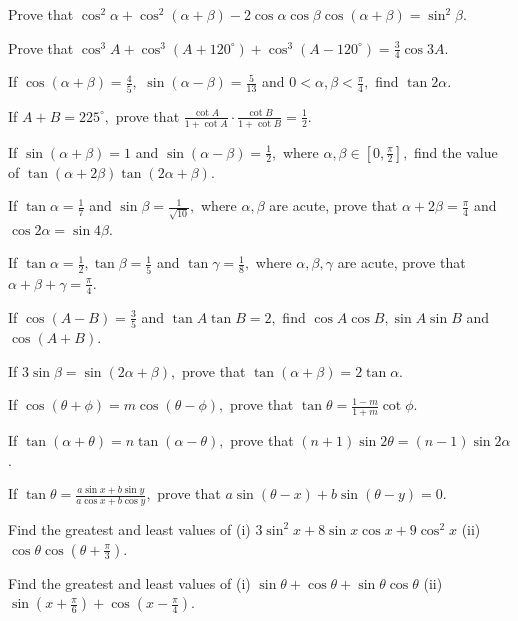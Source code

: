 \item Prove that $\cos^2\alpha + \cos^2(\alpha + \beta) - 2\cos\alpha\cos\beta\cos(\alpha + \beta) = \sin^2\beta$.

\item Prove that $\cos^3A + \cos^3(A + 120^\circ) + \cos^3(A - 120^\circ) = \frac{3}{4}\cos 3A$.

\item If $\cos(\alpha + \beta) = \frac{4}{5},$ $\sin(\alpha - \beta) = \frac{5}{13}$ and $0 < \alpha, \beta <
    \frac{\pi}{4},$ find $\tan 2\alpha$.

\item If $A + B = 225^\circ,$ prove that $\frac{\cot A}{1 + \cot A}\cdot\frac{\cot B}{1 + \cot B} = \frac{1}{2}$.

\item If $\sin(\alpha + \beta) = 1$ and $\sin(\alpha - \beta) = \frac{1}{2},$ where $\alpha, \beta \in \left[0,
    \frac{\pi}{2}\right],$ find the value of $\tan(\alpha + 2\beta)\tan(2\alpha + \beta)$.

\item If $\tan\alpha = \frac{1}{7}$ and $\sin\beta = \frac{1}{\sqrt{10}},$ where $\alpha, \beta$ are acute, prove that
    $\alpha + 2\beta = \frac{\pi}{4}$ and $\cos 2\alpha = \sin 4\beta$.

\item If $\tan\alpha = \frac{1}{2}, \tan\beta = \frac{1}{5}$ and $\tan\gamma = \frac{1}{8},$ where $\alpha, \beta,
    \gamma$ are acute, prove that $\alpha + \beta + \gamma = \frac{\pi}{4}$.

\item If $\cos(A - B) = \frac{3}{5}$ and $\tan A\tan B = 2,$ find $\cos A\cos B, \sin A\sin B$ and $\cos(A + B)$.

\item If $3\sin\beta = \sin(2\alpha + \beta),$ prove that $\tan(\alpha + \beta) = 2\tan\alpha$.

\item If $\cos(\theta + \phi) = m\cos(\theta - \phi),$ prove that $\tan\theta = \frac{1 - m}{1 + m}\cot\phi$.

\item If $\tan(\alpha + \theta) = n\tan(\alpha - \theta),$ prove that $(n + 1)\sin 2\theta = (n - 1)\sin 2\alpha$.

\item If $\tan\theta = \frac{a\sin x + b\sin y}{a\cos x + b\cos y},$ prove that $a\sin(\theta - x) + b\sin(\theta - y) =
    0$.

\item Find the greatest and least values of (i) $3\sin^2 x + 8\sin x\cos x + 9\cos^2 x$ (ii) $\cos\theta\cos\left(\theta
    + \frac{\pi}{3}\right)$.

\item Find the greatest and least values of (i) $\sin\theta + \cos\theta + \sin\theta\cos\theta$ (ii)
    $\sin\left(x + \frac{\pi}{6}\right) + \cos\left(x - \frac{\pi}{4}\right)$.
\stopitemize
